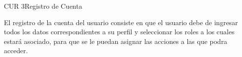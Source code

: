 \begin{UseCase}{CUR 3}{Registro de Cuenta}
    {

    	
    	El registro de la cuenta del usuario consiste en que el usuario debe de ingresar todos los datos correspondientes a su perfil y seleccionar los roles a los cuales estará asociado, para que se le puedan asignar las acciones a las que podra acceder.
    
    	
    }


\end{UseCase}
